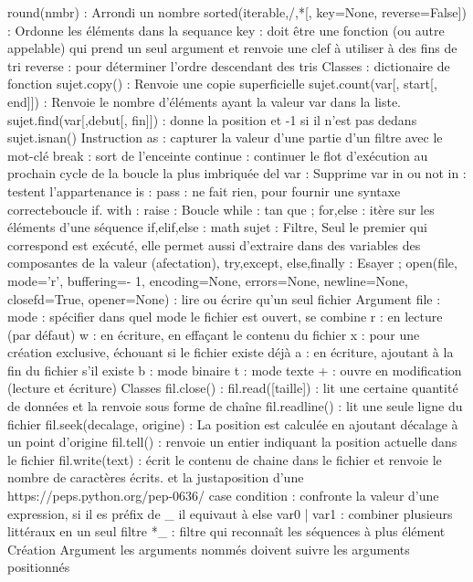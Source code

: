 \documentclass[a4paper,12pt]{report}
\begin{document}
		round(nmbr) : Arrondi un nombre
		sorted(iterable,/,*[, key=None, reverse=False]) : Ordonne les éléments dans la sequance
			key : doit être une fonction (ou autre appelable) qui prend un seul argument et renvoie une clef à utiliser à des fins de tri
			reverse : pour déterminer l'ordre descendant des tris
	Classes : dictionaire de fonction
		sujet.copy() : Renvoie une copie superficielle
		sujet.count(var[, start[, end]]) : Renvoie le nombre d'éléments ayant la valeur var dans la liste.
		sujet.find(var[,debut[, fin]]) : donne la position et -1 si il n'est pas dedans
		sujet.isnan()
	Instruction
		as : capturer la valeur d'une partie d'un filtre avec le mot-clé
		break : sort de l’enceinte
		continue : continuer le flot d'exécution au prochain cycle de la boucle la plus imbriquée
		del var : Supprime var
		in ou not in : testent l’appartenance
		is :
		pass : ne fait rien, pour fournir une syntaxe correcteboucle if.
		with :
		raise :
	Boucle
		while : tan que ; 
		for,else : itère sur les éléments d'une séquence
		if,elif,else : 
		math sujet : Filtre, Seul le premier qui correspond est exécuté, elle permet aussi d'extraire dans des variables des composantes de la valeur (afectation),
		try,except, else,finally : Esayer ; 
	open(file, mode='r', buffering=- 1, encoding=None, errors=None, newline=None, closefd=True, opener=None) : lire ou écrire qu'un seul fichier
		Argument
			file : 
			mode : spécifier dans quel mode le fichier est ouvert, se combine
				r : en lecture (par défaut)
				w : en écriture, en effaçant le contenu du fichier
				x : pour une création exclusive, échouant si le fichier existe déjà
				a : en écriture, ajoutant à la fin du fichier s'il existe
				b : mode binaire
				t : mode texte
				+ : ouvre en modification (lecture et écriture)
		Classes
			fil.close() :
			fil.read([taille]) : lit une certaine quantité de données et la renvoie sous forme de chaîne
			fil.readline() : lit une seule ligne du fichier
			fil.seek(decalage, origine) : La position est calculée en ajoutant décalage à un point d'origine
			fil.tell() : renvoie un entier indiquant la position actuelle dans le fichier
			fil.write(text) : écrit le contenu de chaine dans le fichier et renvoie le nombre de caractères écrits. et la justaposition d'une 
			https://peps.python.org/pep-0636/
			case condition : confronte la valeur d'une expression, si il es préfix de \_ il equivaut à else
			var0 | var1 : combiner plusieurs littéraux en un seul filtre
			*\_ : filtre qui reconnaît les séquences à plus élément
Création
	Argument les arguments nommés doivent suivre les arguments positionnés
\end{document}
